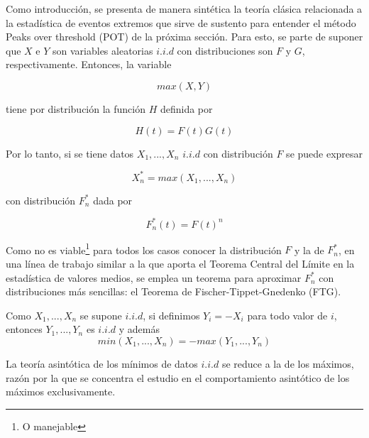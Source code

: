 \documentclass[
  12pt]{article}
\begin{document}
Como introducción, se presenta de manera sintética la teoría clásica
relacionada a la estadística de eventos extremos que sirve de sustento
para entender el método Peaks over threshold (POT) de la próxima
sección. Para esto, se parte de suponer que \(X\) e \(Y\) son variables
aleatorias \(i.i.d\) con distribuciones son \(F\) y \(G\),
respectivamente. Entonces, la variable

\begin{equation}
max(X,Y)
\end{equation}

tiene por distribución la función \(H\) definida por

\begin{equation}
H(t)= F(t) G(t)
\end{equation}

Por lo tanto, si se tiene datos \(X_1,...,X_n\) \(i.i.d\) con
distribución \(F\) se puede expresar

\begin{equation}
X_n^* = max (X_1,...,X_n)
\end{equation}

con distribución \(F_n^*\) dada por

\begin{equation}
F_n^* (t)= F(t)^n
\end{equation}

Como no es viable\footnote{O manejable} para todos los casos conocer la
distribución \(F\) y la de \(F_n^*\), en una línea de trabajo similar a
la que aporta el Teorema Central del Límite en la estadística de valores
medios, se emplea un teorema para aproximar \(F_n^{*}\) con
distribuciones más sencillas: el Teorema de Fischer-Tippet-Gnedenko
(FTG).

\begin{mydefinition}
Como $X_1,...,X_n$ se supone $i.i.d$, si definimos 
$Y_i = -X_i$ para todo valor de $i$, entonces $Y_1,...,Y_n$ es $i.i.d$ y
además
\begin{equation}
min(X_1,...,X_n) = - max(Y_1,...,Y_n)
\end{equation}
\end{mydefinition}

La teoría asintótica de los mínimos de datos \(i.i.d\) se reduce a la de
los máximos, razón por la que se concentra el estudio en el
comportamiento asintótico de los máximos exclusivamente.
\end{document}
